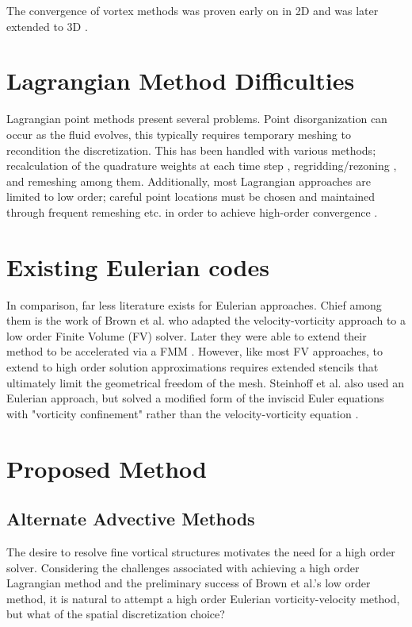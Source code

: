 \documentclass[letterpaper,12pt]{report}
\begin{document}
The convergence of vortex methods was proven early on in 2D \cite{Convg2D} and was later extended to 3D \cite{Convg3D}.

\section{Lagrangian Method Difficulties}
Lagrangian point methods present several problems. Point disorganization can occur as the fluid evolves, this typically requires temporary meshing to recondition the discretization. This has been handled with various methods; recalculation of the quadrature weights at each time step \cite{Remesh2,Remesh3}, regridding/rezoning \cite{Remesh4}, and remeshing \cite{Remesh5} among them. Additionally, most Lagrangian approaches are limited to low order; careful point locations must be chosen and maintained through frequent remeshing etc. in order to achieve high-order convergence \cite{Strain1997}.

\section{Existing Eulerian codes}
In comparison, far less literature exists for Eulerian approaches. Chief among them is the work of Brown et al. \cite{Brown2000} who adapted the velocity-vorticity approach to a low order Finite Volume (FV) solver. Later they were able to extend their method to be accelerated via a FMM \cite{Brown2004}. However, like most FV approaches, to extend to high order solution approximations requires extended stencils that ultimately limit the geometrical freedom of the mesh. Steinhoff et al. also used an Eulerian approach, but solved a modified form of the inviscid Euler equations with "vorticity confinement" rather than the velocity-vorticity equation \cite{SteinhoffUnderhill1994}.
%
\section{Proposed Method}
\subsection{Alternate Advective Methods}
The desire to resolve fine vortical structures motivates the need for a high order solver. Considering the challenges associated with achieving a high order Lagrangian method and the preliminary success of Brown et al.'s low order method, it is natural to attempt a high order Eulerian vorticity-velocity method, but what of the spatial discretization choice?
\end{document}
